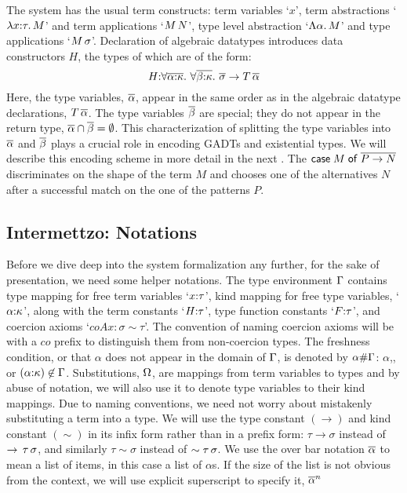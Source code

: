 \documentclass[screen,nonacm,manuscript,review]{acmart} %
\begin{document}
The system has the usual term constructs: term variables `$x$',
term abstractions `$\lambda x{:}\tau.\, M$' and term applications `$M \, N$',
type level abstraction `$\Lambda \alpha.\, M$' and type applications
`$M\,\sigma$'. Declaration of algebraic datatypes introduces data
constructors $H$, the types of which are of the form:
\[
H {:} \forall\overline{\alpha{:}\kappa}.~\forall\overline{\beta{:}\kappa}.~\overline{\sigma} \to T\,\overline{\alpha}
\]
Here, the type variables, $\overline{\alpha}$, appear in the same order as in
the algebraic datatype declarations, $T\,\overline{\alpha}$.
The type variables $\overline{\beta}$ are special; they
do not appear in the return type, $\overline{\alpha} \cap \overline{\beta} = \emptyset$. This
characterization of splitting the type variables into $\overline{\alpha}$
and $\overline{\beta}$ plays a crucial role in encoding GADTs and
existential types. We will describe this encoding scheme in more
detail in the next .
The $\mathsf{case}\;M\;\mathsf{of}\;\overline{P \to N}$
discriminates on the shape of the term $M$ and chooses one of the
alternatives $N$ after a successful match on the one of the patterns
$P$.



\subsection{Intermettzo: Notations}\label{sec:notations}
Before we dive deep into the system formalization any further, for the
sake of presentation, we need some helper notations.
The type environment $\Gamma$ contains type mapping for free term variables
`$x{:}\tau$', kind mapping for free type variables,
`$\alpha{:}\kappa$', along with the term constants `$H{:}\tau$', type
function constants `$F{:} \tau$', and coercion axioms
`$coAx:\sigma\sim\tau$'. The convention of naming
coercion axioms will be with a $co$ prefix to distinguish them from
non-coercion types. The freshness condition, or that $\alpha$ does not appear in the
domain of $\Gamma$, is denoted by $\alpha \# \Gamma$: $\alpha$,, or
$(\alpha{:}\kappa) \not\in \Gamma$. Substitutions, $\Omega$, are mappings from term variables to
types and by abuse of notation, we will also use it to denote type
variables to their kind mappings. Due to naming conventions, we need
not worry about mistakenly substituting a term into a type. We will
use the type constant $(\to)$ and kind constant $(\sim)$ in its infix
form rather than in a prefix form: $\tau \to \sigma$ instead of
$\to \,\tau\,\sigma$, and similarly $\tau\sim\sigma$ instead of
$\sim \tau\,\sigma$. We use the over bar notation $\overline{\alpha}$ to
mean a list of items, in this case a list of $\alpha$s. If the size of
the list is not obvious from the context, we will use explicit
superscript to specify it, $\overline{\alpha}^n$
\end{document}
